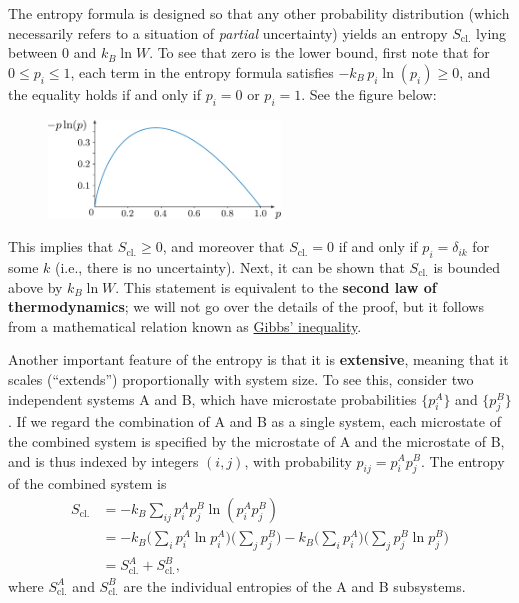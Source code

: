 \documentclass[pra,12pt]{revtex4}
\begin{document}
The entropy formula is designed so that any other probability
distribution (which necessarily refers to a situation of
\textit{partial} uncertainty) yields an entropy $S_{\mathrm{cl.}}$
lying between $0$ and $k_B \ln W$.  To see that zero is the lower
bound, first note that for $0 \le p_i \le 1$, each term in the entropy
formula satisfies $-k_B\, p_i\ln(p_i) \ge 0$, and the equality holds
if and only if $p_i = 0$ or $p_i = 1$.  See the figure below:

\begin{figure}[h]
  \centering\includegraphics[width=0.55\textwidth]{plogp}
\end{figure}

This implies that $S_{\mathrm{cl.}}\ge 0$, and moreover that
$S_{\mathrm{cl.}} = 0$ if and only if $p_i = \delta_{ik}$ for some $k$
(i.e., there is no uncertainty).  Next, it can be shown that
$S_{\mathrm{cl.}}$ is bounded above by $k_B \ln W$.  This statement is
equivalent to the \textbf{second law of thermodynamics}; we will not
go over the details of the proof, but it follows from a mathematical
relation known as
\href{https://en.wikipedia.org/wiki/Gibbs\%27_inequality}{Gibbs'
  inequality}.

Another important feature of the entropy is that it is
\textbf{extensive}, meaning that it scales (``extends'')
proportionally with system size.  To see this, consider two
independent systems A and B, which have microstate probabilities
$\{p_i^A\}$ and $\{p_j^B\}$.  If we regard the combination of A and B
as a single system, each microstate of the combined system is
specified by the microstate of A and the microstate of B, and is thus
indexed by integers $(i,j)$, with probability $p_{ij} = p^A_ip^B_j$.
The entropy of the combined system is
$$\begin{aligned}S_{\mathrm{cl.}} &= - k_B \sum_{ij} p_i^Ap^B_j \ln\left(p^A_ip^B_j\right) \\
  &= - k_B \Big(\sum_{i} p^A_i \ln p^A_i\Big)\Big(\sum_j p^B_j\Big)
  - k_B \Big(\sum_{i} p^A_i \Big) \Big(\sum_j p^B_j \ln p^B_j\Big) \\
  &= S_{\mathrm{cl.}}^A + S_{\mathrm{cl.}}^B,
\end{aligned}$$
where $S_{\mathrm{cl.}}^A$ and $S_{\mathrm{cl.}}^B$ are the individual
entropies of the A and B subsystems.
\end{document}
